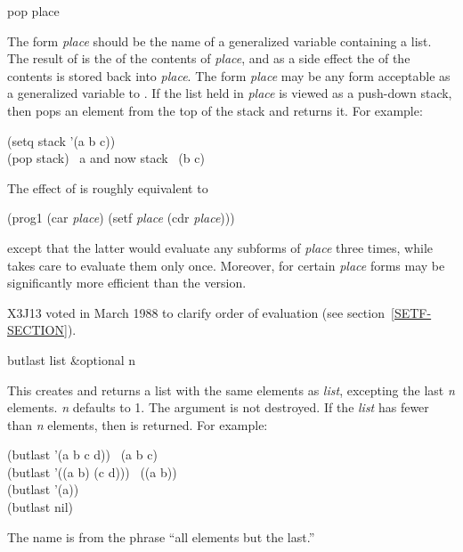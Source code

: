 \begin{defmac}
pop place

The form {\it place} should be the name of a generalized variable
containing a list.  The result of  is the  of the contents
of {\it place}, and as a side effect the  of the contents is stored
back into {\it place}.  The form {\it place} may be any form acceptable as a
generalized variable to .  If the list held in {\it place} is
viewed as a push-down stack, then  pops an element from the top of
the stack and returns it.
For example:
\begin{lisp}
(setq stack '(a b c)) \\
(pop stack) \EV\ a  {\rm and now} stack \EV\ (b c)
\end{lisp}
The effect of  is roughly equivalent to
\begin{lisp}
(prog1 (car {\it place}) (setf {\it place} (cdr {\it place})))
\end{lisp}
except that the latter would evaluate any subforms of {\it place}
three times, while  takes care to evaluate them only once.
Moreover, for certain {\it place} forms  may be
significantly more efficient than the  version.
\begin{newer}
X3J13 voted in March 1988 
to clarify order of evaluation (see section~\ref{SETF-SECTION}).
\end{newer}
\end{defmac}

\begin{defun}[Function]
butlast list &optional n

This creates and returns a list with the same elements as {\it list},
excepting the last {\it n} elements.
{\it n} defaults to 1.  The argument is not destroyed.
If the {\it list} has fewer than {\it n} elements, then {\emptylist} is returned.
For example:
\begin{lisp}
(butlast '(a b c d)) \EV\ (a b c) \\
(butlast '((a b) (c d))) \EV\ ((a b)) \\
(butlast '(a)) \EV\ {\emptylist} \\
(butlast nil) \EV\ {\emptylist}
\end{lisp}
The name is from the phrase ``all elements but the last.''
\end{defun}

